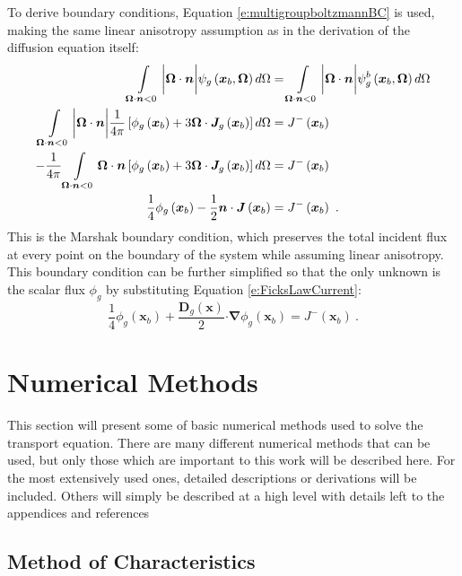 To derive boundary conditions, Equation \ref{e:multigroupboltzmannBC} is used, making the same linear anisotropy assumption as in the derivation of the diffusion equation itself:
\begin{align}
\intop_{\bm \Omega \cdot \bm n < 0} \bigg|\bm \Omega \cdot \bm n\bigg|\psi_g\left(\bm x_b, \bm \Omega\right) d\Omega &= \intop_{\bm \Omega \cdot \bm n < 0} \bigg|\bm \Omega \cdot \bm n\bigg|\psi_g^b\left(\bm x_b, \bm \Omega\right) d\Omega \nonumber \\
\intop_{\bm \Omega \cdot \bm n < 0} \bigg|\bm \Omega \cdot \bm n\bigg| \frac{1}{4\pi} \left[\phi_g\left(\bm x_b\right) + 3\bm \Omega \cdot \bm J_g\left(\bm x_b\right)\right] d\Omega &= J^-\left(\bm x_b\right) \nonumber \\
-\frac{1}{4\pi}\intop_{\bm \Omega \cdot \bm n < 0} \bm \Omega \cdot \bm n \left[\phi_g\left(\bm x_b\right) + 3\bm \Omega \cdot \bm J_g\left(\bm x_b\right)\right] d\Omega &= J^-\left(\bm x_b\right) \nonumber \\
\frac{1}{4} \phi_g\left(\bm x_b\right) - \frac{1}{2} \bm n \cdot \bm J\left(\bm x_b\right) &= J^-\left(\bm x_b\right)\ .
\end{align}
This is the Marshak boundary condition, which preserves the total incident flux at every point on the boundary of the system while assuming linear anisotropy.  This boundary condition can be further simplified so that the only unknown is the scalar flux $\phi_g$ by substituting Equation \ref{e:FicksLawCurrent}:
\begin{equation}\label{e:DiffusionEquationBC}
\frac{1}{4} \phi_g\left(\bm x_b\right) + \frac{\bm D_g\left(\bm x\right)}{2} \bm \cdot \bm \nabla \phi_g\left(\bm x_b\right) = J^-\left(\bm x_b\right)\ .
\end{equation}

\section{Numerical Methods}

This section will present some of basic numerical methods used to solve the transport equation.  There are many different numerical methods that can be used, but only those which are important to this work will be described here.  For the most extensively used ones, detailed descriptions or derivations will be included.  Others will simply be described at a high level with details left to the appendices and references

\subsection{Method of Characteristics}\label{ss:MOCtheory}

